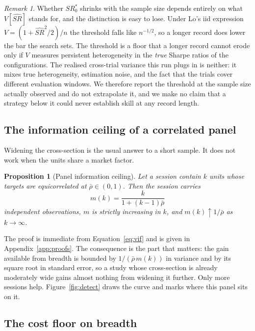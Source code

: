 \documentclass{article}
\theoremstyle{plain}
\newtheorem{proposition}{Proposition}
\theoremstyle{remark}
\newtheorem{remark}{Remark}
\begin{document}
\begin{remark}
Whether $SR^{\ast}_0$ shrinks with the sample size depends entirely on what
$V[\hat{SR}]$ stands for, and the distinction is easy to lose. Under Lo's iid
expression $V = (1 + \hat{SR}^2/2)/n$ the threshold falls like $n^{-1/2}$, so a
longer record does lower the bar the search sets. The threshold is a floor that a
longer record cannot erode only if $V$ measures persistent heterogeneity in the
\emph{true} Sharpe ratios of the configurations. The realised cross-trial
variance this run plugs in is neither: it mixes true heterogeneity, estimation
noise, and the fact that the trials cover different evaluation windows. We
therefore report the threshold at the sample size actually observed and do not
extrapolate it, and we make no claim that a strategy below it could never
establish skill at any record length.
\end{remark}

\subsection{The information ceiling of a correlated panel}
\label{sec:ceiling}

Widening the cross-section is the usual answer to a short sample. It does not
work when the units share a market factor.

\begin{proposition}[Panel information ceiling]
\label{prop:ceiling}
Let a session contain $k$ units whose targets are equicorrelated at
$\bar\rho \in (0,1)$. Then the session carries
\begin{equation}
m(k) = \frac{k}{1 + (k-1)\bar\rho}
\end{equation}
independent observations, $m$ is strictly increasing in $k$, and
$m(k) \uparrow 1/\bar\rho$ as $k \to \infty$.
\end{proposition}

The proof is immediate from Equation~\ref{eq:vif} and is given in
Appendix~\ref{app:proofs}. The consequence is the part that matters: the gain
available from breadth is bounded by $1/(\bar\rho\, m(k))$ in variance and by its
square root in standard error, so a study whose cross-section is already
moderately wide gains almost nothing from widening it further. Only more sessions
help. Figure~\ref{fig:detect} draws the curve and marks where this panel sits on
it.

\subsection{The cost floor on breadth}
\label{sec:feasible}
\end{document}
